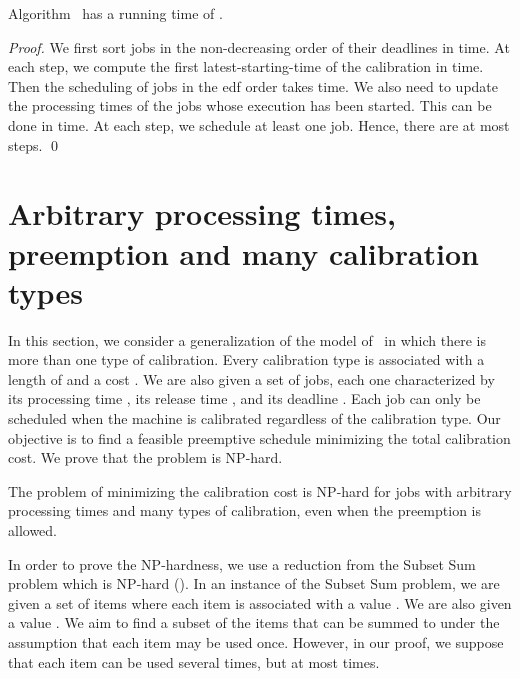 \begin{prop}
Algorithm~ has a running time of .
\end{prop}

\begin{proof}
We first sort jobs in the non-decreasing order of their deadlines in  time. At each step, we compute the first latest-starting-time of the calibration in  time. Then the scheduling of jobs in the {\sc edf} order takes  time. We also need to update the processing times of the jobs whose execution has been started. This can be done in  time. At each step, we schedule at least one job. Hence, there are at most  steps.
\qed\end{proof}

\section{Arbitrary processing times, preemption and many calibration types}
\label{sec:arbitrary_pj}
In this section, we consider a generalization of the model of~\cite{bender2013efficient} in which there is more than one type of calibration. Every calibration type is associated with a length of  and a cost . We are also given a set of jobs, each one characterized by its processing time , its release time , and its deadline . Each job can only be scheduled when the machine is calibrated regardless of the calibration type. Our objective is to find a feasible preemptive schedule minimizing the total calibration cost. We prove that the problem is NP-hard.

\begin{prop}    \label{prop_np_hard}
The problem of minimizing the calibration cost is NP-hard for jobs with arbitrary processing times and many types of calibration,
even when the preemption is allowed.
\end{prop}

In order to prove the NP-hardness, we use a reduction from the {\sc Subset Sum} problem which is NP-hard (\cite{johnson1979computers}). In an instance of the {\sc Subset Sum} problem, we are given a set of  items where
each item  is associated with a value . We are also given a value . We aim to find a subset of the items that can be summed to  under the assumption that each item may be used once. However, in our proof, we suppose that each item can be used several times, but at most  times.

